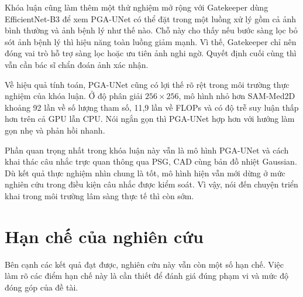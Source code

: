 Khóa luận cũng làm thêm một thử nghiệm mở rộng với Gatekeeper dùng EfficientNet-B3 để xem PGA-UNet có thể đặt trong một luồng xử lý gồm cả ảnh bình thường và ảnh bệnh lý như thế nào. Chỗ này cho thấy nếu bước sàng lọc bỏ sót ảnh bệnh lý thì hiệu năng toàn luồng giảm mạnh. Vì thế, Gatekeeper chỉ nên đóng vai trò hỗ trợ sàng lọc hoặc ưu tiên ảnh nghi ngờ. Quyết định cuối cùng thì vẫn cần bác sĩ chẩn đoán ảnh xác nhận.

Về hiệu quả tính toán, PGA-UNet cũng có lợi thế rõ rệt trong môi trường thực nghiệm của khóa luận. Ở độ phân giải $256\times256$, mô hình nhỏ hơn SAM-Med2D khoảng 92 lần về số lượng tham số, 11,9 lần về FLOPs và có độ trễ suy luận thấp hơn trên cả GPU lẫn CPU. Nói ngắn gọn thì PGA-UNet hợp hơn với hướng làm gọn nhẹ và phản hồi nhanh.

Phần quan trọng nhất trong khóa luận này vẫn là mô hình PGA-UNet và cách khai thác câu nhắc trực quan thông qua PSG, CAD cùng bản đồ nhiệt Gaussian. Dù kết quả thực nghiệm nhìn chung là tốt, mô hình hiện vẫn mới dừng ở mức nghiên cứu trong điều kiện câu nhắc được kiểm soát. Vì vậy, nói đến chuyện triển khai trong môi trường lâm sàng thực tế thì còn sớm.

\section{Hạn chế của nghiên cứu}
\label{sec:han_che}

Bên cạnh các kết quả đạt được, nghiên cứu này vẫn còn một số hạn chế. Việc làm rõ các điểm hạn chế này là cần thiết để đánh giá đúng phạm vi và mức độ đóng góp của đề tài.

